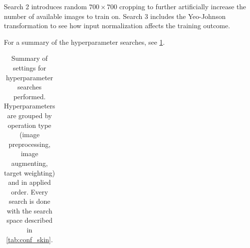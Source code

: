 Search 2 introduces random $700\times700$ cropping to further artificially increase the number of available images to train on.
Search 3 includes the Yeo-Johnson transformation to see how input normalization affects the training outcome.

For a summary of the hyperparameter searches, see \cref{tab:skin_studies}.

\begin{table}
    \caption[\textsc{Skinstression} hyperparameter search studies]{
        Summary of settings for hyperparameter searches performed.
        Hyperparameters are grouped by operation type (image preprocessing, image augmenting, target weighting) and in applied order.
        Every search is done with the search space described in \cref{tab:conf_skin}.
    }
    \label{tab:skin_studies}
    \begin{tabular}{lcccc}


\end{tabular}
\end{table}
